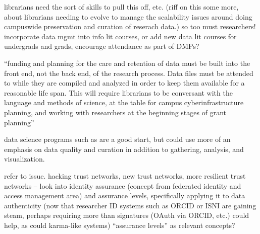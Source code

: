 \documentclass{acm_proc_article-sp}
\begin{document}
librarians need the sort of skills to pull this off, etc. (riff on
this some more, about librarians needing to evolve to manage the
scalability issues around doing campuswide preservation and curation
of reserach data.) so too must researchers!  incorporate data mgmt
into info lit courses, or add new data lit courses for undergrads and
grads, encourage attendance as part of DMPs?

``funding and planning for the care and retention of data must be
built into the front end, not the back end, of the research
process. Data files must be attended to while they are compiled and
analyzed in order to keep them available for a reasonable life
span. This will require librarians to be conversant with the language
and methods of science, at the table for campus cyberinfrastructure
planning, and working with researchers at the beginning stages of
grant planning'' \cite{ogburn:imperative}

data science programs such as \cite{uw:datascience} are a good start,
but could use more of an emphasis on data quality and curation in
addition to gathering, analysis, and visualization.

refer to \cite{timmer:faking} issue. hacking trust networks, new trust
networks, more resilient trust networks -- look into identity
assurance (concept from federated identity and access management area)
and assurance levels, specifically applying it to data authenticity
(now that researcher ID systems such as ORCID or ISNI are gaining
steam, perhaps requiring more than signatures (OAuth via ORCID, etc.)
could help, as could karma-like systems) ``assurance levels'' as relevant
concepts?

{}



\end{document}
